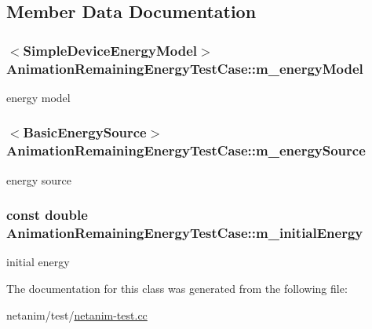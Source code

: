 \subsection{Member Data Documentation}
\subsubsection[{\texorpdfstring{m\+\_\+energy\+Model}{m_energyModel}}]{$<${\bf Simple\+Device\+Energy\+Model}$>$ Animation\+Remaining\+Energy\+Test\+Case\+::m\+\_\+energy\+Model\hspace{0.3cm}{\ttfamily [private]}}\hypertarget{classAnimationRemainingEnergyTestCase_a992202ae075859acd996f44fd3396d68}{}\label{classAnimationRemainingEnergyTestCase_a992202ae075859acd996f44fd3396d68}


energy model 

\subsubsection[{\texorpdfstring{m\+\_\+energy\+Source}{m_energySource}}]{$<${\bf Basic\+Energy\+Source}$>$ Animation\+Remaining\+Energy\+Test\+Case\+::m\+\_\+energy\+Source\hspace{0.3cm}{\ttfamily [private]}}\hypertarget{classAnimationRemainingEnergyTestCase_ab57a5fb126e09a5001d23ced08867778}{}\label{classAnimationRemainingEnergyTestCase_ab57a5fb126e09a5001d23ced08867778}


energy source 

\subsubsection[{\texorpdfstring{m\+\_\+initial\+Energy}{m_initialEnergy}}]{\setlength{\rightskip}{0pt plus 5cm}const double Animation\+Remaining\+Energy\+Test\+Case\+::m\+\_\+initial\+Energy\hspace{0.3cm}{\ttfamily [private]}}\hypertarget{classAnimationRemainingEnergyTestCase_a2e8b91bd1e920bea38977402cd602b3c}{}\label{classAnimationRemainingEnergyTestCase_a2e8b91bd1e920bea38977402cd602b3c}


initial energy 



The documentation for this class was generated from the following file\+:\begin{DoxyCompactItemize}
\item 
netanim/test/\hyperlink{netanim-test_8cc}{netanim-\/test.\+cc}\end{DoxyCompactItemize}
